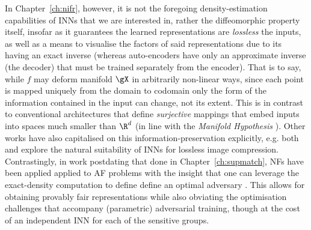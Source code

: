 %
In Chapter~\ref{ch:nifr}, however, it is not the foregoing density-estimation capabilities of INNs
that we are interested in, rather the diffeomorphic property itself, insofar as it guarantees the
learned representations are \emph{lossless} \wrt{} the inputs, as well as a means to visualise the
factors of said representations due to its having an exact inverse (whereas auto-encoders have only
an approximate inverse (the decoder) that must be trained separately from the encoder).
%
That is to say, while \(f\) may deform manifold \(\gX\) in arbitrarily non-linear ways, since each
point is mapped uniquely from the domain to codomain only the form of the information contained in
the input can change, not its extent. 
%
This is in contrast to conventional architectures that define \emph{surjective} mappings that embed
inputs into spaces much smaller than \(\R^d\) (in line with the \emph{Manifold Hypothesis}
\citep{fefferman2016testing}).
%
Other works have also capitalised on this information-preservation explicitly, e.g. both
\cite{hoogeboom2019integer} and \cite{xie2021enhanced} explore the natural suitability of INNs for
lossless image compression.
%
Contrastingly, in work postdating that done in Chapter~\ref{ch:supmatch}, \acp{NF} have been
applied applied to \ac{AF} problems with the insight that one can leverage the exact-density
computation to define define an optimal adversary \citep{balunovic2021fair, cerrato2022fair}. 
%
This allows for obtaining provably fair representations while also obviating the optimisation
challenges that accompany (parametric) adversarial training, though at the cost of an independent
\ac{INN} for each of the sensitive groups.

